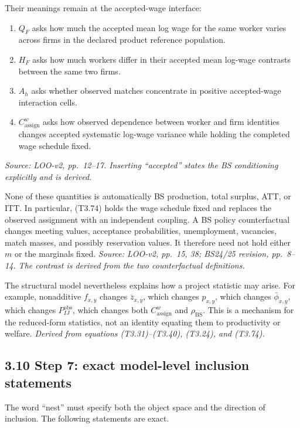 \documentclass[11pt]{article}
\begin{document}
Their meanings remain at the accepted-wage interface:

\begin{enumerate}
\item \(Q_F\) asks how much the accepted mean log wage for the same worker
  varies across firms in the declared product reference population.
\item \(H_F\) asks how much workers differ in their accepted mean log-wage
  contrasts between the same two firms.
\item \(A_h\) asks whether observed matches concentrate in positive
  accepted-wage interaction cells.
\item \(C^w_{\mathrm{assign}}\) asks how observed dependence between worker
  and firm identities changes accepted systematic log-wage variance while
  holding the completed wage schedule fixed.
\end{enumerate}

\textit{Source: LOO-v2, pp.\ 12--17.  Inserting ``accepted'' states the BS
conditioning explicitly and is derived.}

None of these quantities is automatically BS production, total surplus, ATT,
or ITT.  In particular, (T3.74) holds the wage schedule fixed and replaces the
observed assignment with an independent coupling.  A BS policy counterfactual
changes meeting values, acceptance probabilities, unemployment, vacancies,
match masses, and possibly reservation values.  It therefore need not hold
either \(m\) or the marginals fixed.
\textit{Source: LOO-v2, pp.\ 15, 38; BS24/25 revision, pp.\ 8--14.
The contrast is derived from the two counterfactual definitions.}

The structural model nevertheless explains how a project statistic may arise.
For example, nonadditive \(f_{x,y}\) changes \(\bar z_{x,y}\), which changes
\(p_{x,y}\), which changes \(\bar\phi_{x,y}\), which changes
\(P^{\mathrm{obs}}_{IJ}\), which changes both
\(C^w_{\mathrm{assign}}\) and \(\rho_{\mathrm{BS}}\).  This is a mechanism for
the reduced-form statistics, not an identity equating them to productivity or
welfare.
\textit{Derived from equations (T3.31)--(T3.40), (T3.24), and (T3.74).}

\subsection{3.10 Step 7: exact model-level inclusion statements}

The word ``nest'' must specify both the object space and the direction of
inclusion.  The following statements are exact.
\end{document}
